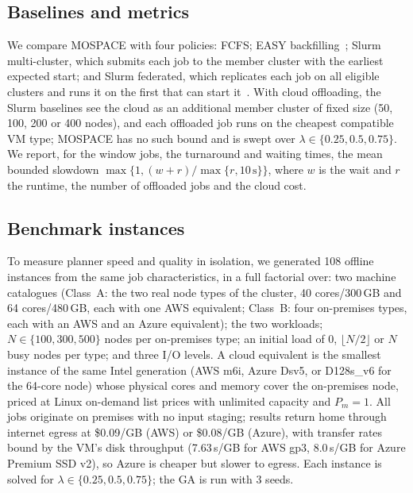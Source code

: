 \documentclass[conference]{IEEEtran}
\begin{document}
\subsection{Baselines and metrics}

We compare MOSPACE with four policies: FCFS; EASY backfilling~\cite{Lifka1995}; Slurm multi-cluster, which submits each job to the member cluster with the earliest expected start; and Slurm federated, which replicates each job on all eligible clusters and runs it on the first that can start it~\cite{Jette2023}. With cloud offloading, the Slurm baselines see the cloud as an additional member cluster of fixed size (50, 100, 200 or 400 nodes), and each offloaded job runs on the cheapest compatible VM type; MOSPACE has no such bound and is swept over $\lambda\in\{0.25,0.5,0.75\}$.  We report, for the window jobs, the turnaround and waiting times, the mean bounded slowdown $\max\{1,(w+r)/\max\{r,10\,\mathrm{s}\}\}$, where $w$ is the wait and $r$ the runtime, the number of offloaded jobs and the cloud cost.

\subsection{Benchmark instances}

To measure planner speed and quality in isolation, we generated 108 offline instances from the same job characteristics, in a full factorial over: two machine catalogues (Class~A: the two real node types of the cluster, 40 cores/300\,GB and 64 cores/480\,GB, each with one AWS equivalent; Class~B: four on-premises types, each with an AWS and an Azure equivalent); the two workloads; $N\in\{100,300,500\}$ nodes per on-premises type; an initial load of 0, $\lfloor N/2\rfloor$ or $N$ busy nodes per type; and three I/O levels. A cloud equivalent is the smallest instance of the same Intel generation (AWS m6i, Azure Dsv5, or D128s\_v6 for the 64-core node) whose physical cores and memory cover the on-premises node, priced at Linux on-demand list prices with unlimited capacity and $P_m=1$. All jobs originate on premises with no input staging; results return home through internet egress at \$0.09/GB (AWS) or \$0.08/GB (Azure), with transfer rates bound by the VM's disk throughput (7.63\,s/GB for AWS gp3, 8.0\,s/GB for Azure Premium SSD v2), so Azure is cheaper but slower to egress.  Each instance is solved for $\lambda\in\{0.25,0.5,0.75\}$; the GA is run with 3 seeds.
\end{document}
